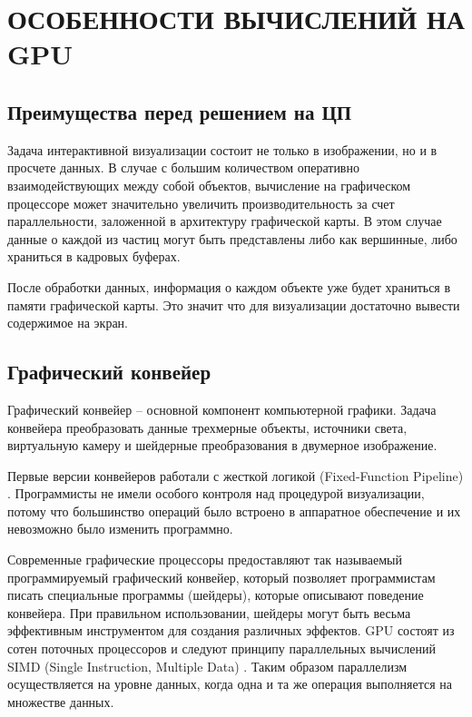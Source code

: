\newpage
\section{ОСОБЕННОСТИ ВЫЧИСЛЕНИЙ НА GPU}

\subsection{Преимущества перед решением на ЦП}

Задача интерактивной визуализации состоит не только в изображении, но и в просчете данных.
В случае с большим количеством оперативно взаимодействующих между собой объектов, вычисление
на графическом процессоре может значительно увеличить производительность за счет параллельности,
заложенной в архитектуру графической карты. В этом случае данные о каждой из частиц могут быть
представлены либо как вершинные, либо храниться в кадровых буферах.

После обработки данных, информация о каждом объекте уже будет храниться в памяти графической карты.
Это значит что для визуализации достаточно вывести содержимое на экран.

\subsection{Графический конвейер}

Графический конвейер -- основной компонент компьютерной графики. Задача конвейера преобразовать
данные трехмерные объекты, источники света, виртуальную камеру и шейдерные преобразования в 
двумерное изображение.

Первые версии конвейеров работали с жесткой логикой (Fixed-Function Pipeline) \cite{raytracing02}.
Программисты не имели особого контроля над процедурой визуализации, потому что большинство
операций было встроено в аппаратное обеспечение и их невозможно было изменить программно.

Современные графические процессоры предоставляют так называемый программируемый графический
конвейер, который позволяет программистам писать специальные программы (шейдеры), которые
описывают поведение конвейера. При правильном использовании, шейдеры могут быть весьма эффективным
инструментом для создания различных эффектов. GPU состоят из сотен поточных процессоров и следуют
принципу параллельных вычислений SIMD (Single Instruction, Multiple Data) \cite{gpu}. Таким образом
параллелизм осуществляется на уровне данных, когда одна и та же операция выполняется
на множестве данных.

